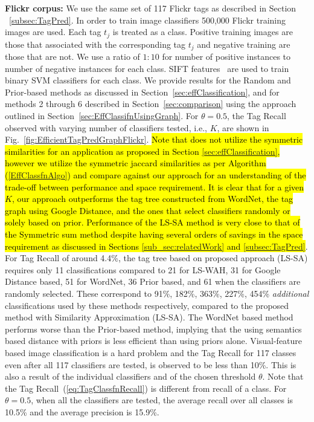 \textbf{Flickr corpus:} We use the same set of 117 Flickr tags as described in Section ~\ref{subsec:TagPred}. In order to train image classifiers 500,000 Flickr training images are used. Each tag $t_j$ is treated as a class. Positive training images are those that associated with the corresponding tag $t_j$ and negative training are those that are not. We use a ratio of $1:10$ for number of positive instances to number of negative instances for each class. SIFT features~\cite{lowe} are used to train binary SVM classifiers for each class. We provide results for the Random and Prior-based methods as discussed in Section~\ref{sec:effClassification}, and for methods 2 through 6 described in Section~\ref{sec:comparison} using the approach outlined in Section~\ref{sec:EffClassifnUsingGraph}. For $\theta = 0.5$, the Tag Recall observed with varying number of classifiers tested, i.e., $K$, are shown in Fig.~\ref{fig:EfficientTagPredGraphFlickr}. \hl{Note that {\cite{sigurbjornsson2008flickr}} does not utilize the symmetric similarities for an application as proposed in Section {\ref{sec:effClassification}}, however we utilize the symmetric jaccard similarities as per Algorithm ({\ref{EffClassfnAlgo}}) and compare against our approach for an understanding of the trade-off between performance and space requirement. 
 It is clear that for a given $K$, our approach outperforms the tag tree constructed from WordNet, the tag graph using Google Distance, and the ones that select classifiers randomly or solely based on prior. Performance of the LS-SA method is very close to that of the Symmetric sum method despite having several orders of savings in the space requirement as discussed in Sections {\ref{sub_sec:relatedWork}} and {\ref{subsec:TagPred}}}. For Tag Recall of around 4.4\%, the tag tree based on proposed approach (LS-SA) requires only 11 classifications compared to 21 for LS-WAH, 31 for Google Distance based, 51 for WordNet, 36 Prior based, and 61 when the classifiers are randomly selected. These correspond to 91\%, 182\%, 363\%, 227\%, 454\% \textit{additional} classifications used by these methods respectively, compared to the proposed method with Similarity Approximation (LS-SA). The WordNet based method performs worse than the Prior-based method, implying that the using semantics based distance with priors is less efficient than using priors alone. Visual-feature based image classification is a hard problem and the Tag Recall for 117 classes even after all 117 classifiers are tested, is observed to be less than 10\%. This is also a result of the individual classifiers and of the chosen threshold $\theta$. Note that the Tag Recall~(\ref{eq:TagClassfnRecall}) is different from recall of a class. For $\theta=0.5$, when all the classifiers are tested, the average recall over all classes is 10.5\% and the average precision is 15.9\%. \\
